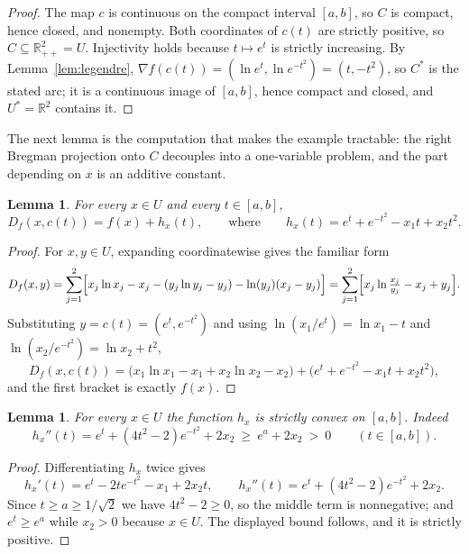 \documentclass[11pt]{amsart}
\theoremstyle{plain}
\newtheorem{lemma}[theorem]{Lemma}
\theoremstyle{definition}
\theoremstyle{remark}
\newcommand{\R}{\mathbb{R}}
\newcommand{\D}{D_f}
\newcommand{\Cstar}{C^{*}}
\begin{document}
\begin{proof}
The map $c$ is continuous on the compact interval $[a,b]$, so $C$ is compact,
hence closed, and nonempty. Both coordinates of $c(t)$ are strictly positive, so
$C \subseteq \R^{2}_{++} = U$. Injectivity holds because $t \mapsto e^{t}$ is
strictly increasing. By Lemma~\ref{lem:legendre},
$\nabla f(c(t)) = (\ln e^{t}, \ln e^{-t^{2}}) = (t, -t^{2})$, so $\Cstar$ is the
stated arc; it is a continuous image of $[a,b]$, hence compact and closed, and
$U^{*} = \R^{2}$ contains it.
\end{proof}

The next lemma is the computation that makes the example tractable: the right
Bregman projection onto $C$ decouples into a one-variable problem, and the part
depending on $x$ is an additive constant.

\begin{lemma}\label{lem:reduce}
For every $x \in U$ and every $t \in [a,b]$,
\[
  \D(x, c(t)) = f(x) + h_{x}(t),
  \qquad\text{where}\qquad
  h_{x}(t) = e^{t} + e^{-t^{2}} - x_{1} t + x_{2} t^{2}.
\]
\end{lemma}

\begin{proof}
For $x, y \in U$, expanding coordinatewise gives the familiar form
\[
  \D(x,y)
  = \sum_{j=1}^{2}
    \Bigl[ x_{j} \ln x_{j} - x_{j} - (y_{j} \ln y_{j} - y_{j})
           - \ln(y_{j})(x_{j} - y_{j}) \Bigr]
  = \sum_{j=1}^{2}
    \Bigl[ x_{j} \ln \tfrac{x_{j}}{y_{j}} - x_{j} + y_{j} \Bigr].
\]
Substituting $y = c(t) = (e^{t}, e^{-t^{2}})$ and using
$\ln(x_{1}/e^{t}) = \ln x_{1} - t$ and
$\ln(x_{2}/e^{-t^{2}}) = \ln x_{2} + t^{2}$,
\[
  \D(x, c(t))
  = \bigl( x_{1} \ln x_{1} - x_{1} + x_{2} \ln x_{2} - x_{2} \bigr)
    + \bigl( e^{t} + e^{-t^{2}} - x_{1} t + x_{2} t^{2} \bigr),
\]
and the first bracket is exactly $f(x)$.
\end{proof}

\begin{lemma}\label{lem:convex}
For every $x \in U$ the function $h_{x}$ is strictly convex on $[a,b]$. Indeed
\[
  h_{x}''(t) = e^{t} + (4t^{2} - 2) e^{-t^{2}} + 2 x_{2}
  \ \ge\ e^{a} + 2 x_{2}
  \ >\ 0
  \qquad (t \in [a,b]).
\]
\end{lemma}

\begin{proof}
Differentiating $h_{x}$ twice gives
\[
  h_{x}'(t) = e^{t} - 2t e^{-t^{2}} - x_{1} + 2 x_{2} t,
  \qquad
  h_{x}''(t) = e^{t} + (4t^{2} - 2) e^{-t^{2}} + 2 x_{2} .
\]
Since $t \ge a \ge 1/\sqrt{2}$ we have $4t^{2} - 2 \ge 0$, so the middle term is
nonnegative; and $e^{t} \ge e^{a}$ while $x_{2} > 0$ because $x \in U$. The
displayed bound follows, and it is strictly positive.
\end{proof}
\end{document}
